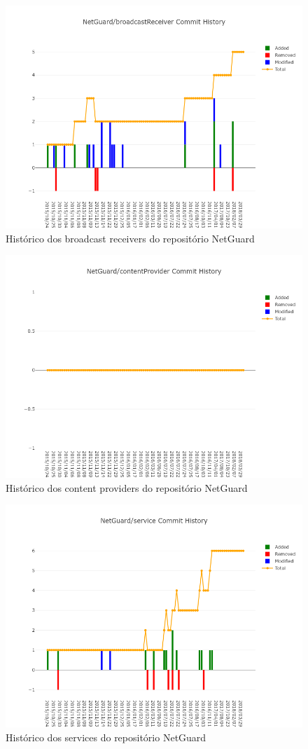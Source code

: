 \documentclass[a4paper,12pt]{article}
\begin{document}
\begin{figure}[H]
\centering
\includegraphics[width=\linewidth,height=0.5\linewidth]{imgs/NetGuard_broadcastReceiver_history.png}
\caption{Histórico dos broadcast receivers do repositório NetGuard}
\label{fig:repobroadcast}
\end{figure}

\begin{figure}[H]
\centering
\includegraphics[width=\linewidth,height=0.5\linewidth]{imgs/NetGuard_contentProvider_history.png}
\caption{Histórico dos content providers do repositório NetGuard}
\label{fig:reporeceiver}
\end{figure}

\begin{figure}[H]
\centering
\includegraphics[width=\linewidth,height=0.5\linewidth]{imgs/NetGuard_service_history.png}
\caption{Histórico dos services do repositório NetGuard}
\label{fig:reposervice}
\end{figure}
\end{document}
